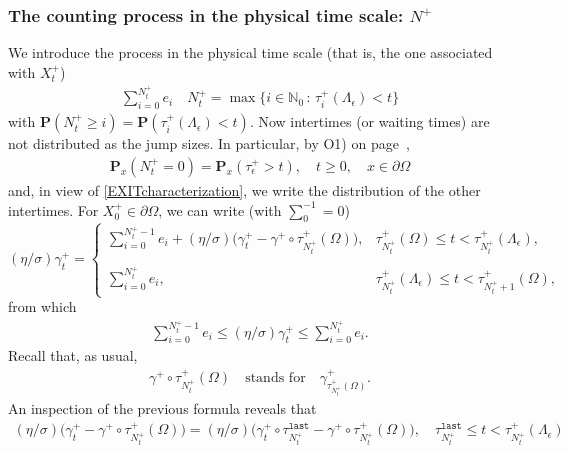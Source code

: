 \documentclass[11pt,a4paper]{article}
\begin{document}
{\subsubsection{The counting process in the physical time scale: $N^+$}
We introduce the process in the physical time scale (that is, the one associated with $X^+_t$)
\begin{align}
\label{totalAmountLT}
\sum_{i=0}^{N^+_t} e_i \quad N^+_t = \max \{ i \in \mathbb{N}_0\,:\, \tau^+_i(\Lambda_\epsilon) < t\}
\end{align}
with $\mathbf{P}(N^+_t \geq i) = \mathbf{P}(\tau^+_i(\Lambda_\epsilon) < t)$. Now intertimes (or waiting times) are not distributed as the jump sizes. In particular, by O1) on page~\pageref{pageOcc12},
\begin{align*}
\mathbf{P}_x(N^+_t = 0) = \mathbf{P}_x(\tau^+_\epsilon >t), \quad t \geq 0, \quad x \in \partial \Omega
\end{align*}
and, in view of \eqref{EXITcharacterization}, we write the distribution of the other intertimes. For $X^+_0 \in \partial \Omega$, we can write (with $\sum_0^{-1}=0$)
\begin{equation}
(\eta/\sigma) \gamma^+_t = \left\lbrace
\begin{array}{ll}
\displaystyle \sum_{i=0}^{N^+_t - 1} e_i + (\eta/\sigma)\bigg( \gamma^+_t - \gamma^+ \circ \tau^+_{N^+_t}(\Omega) \bigg), & \tau^+_{N^+_t}(\Omega) \leq t < \tau^+_{N^+_t}(\Lambda_\epsilon),\\
\\
\displaystyle \sum_{i=0}^{N^+_t} e_i, & \tau^+_{N^+_t}(\Lambda_\epsilon) \leq t <  \tau^+_{N^+_t+1}(\Omega),
\end{array}
\right .
\label{gammaRepViaCompPoisson}
\end{equation}
from which
\begin{align*}
\sum_{i=0}^{N^+_t - 1} e_i \leq (\eta/\sigma) \gamma^+_t \leq \sum_{i=0}^{N^+_t} e_i.
\end{align*}
Recall that, as usual, 
\begin{align*}
\gamma^+ \circ \tau^+_{N^+_t}(\Omega) \quad \textrm{stands for} \quad \gamma^+_{\tau^+_{N^+_t}(\Omega)}.
\end{align*}
An inspection of the previous formula reveals that 
\begin{align*}
(\eta/\sigma) \bigg(  \gamma^+_t - \gamma^+ \circ \tau^+_{N^+_t}(\Omega) \bigg) = (\eta/\sigma) \bigg( \gamma^+_t \circ \tau^\texttt{last}_{N^+_t} - \gamma^+ \circ \tau^+_{N^+_t}(\Omega)\bigg), \quad \tau^\texttt{last}_{N^+_t} \leq t < \tau^+_{N^+_t}(\Lambda_\epsilon)

\end{align*}}
\end{document}
